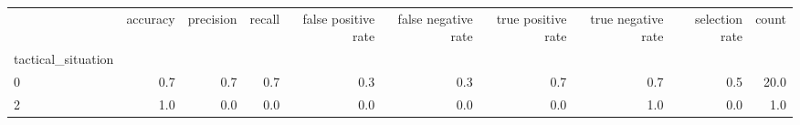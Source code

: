 \begin{tabular}{lrrrrrrrrr}
\toprule
{} &  accuracy &  precision &  recall &  false positive rate &  false negative rate &  true positive rate &  true negative rate &  selection rate &  count \\
tactical\_situation &           &            &         &                      &                      &                     &                     &                 &        \\
\midrule
0                  &       0.7 &        0.7 &     0.7 &                  0.3 &                  0.3 &                 0.7 &                 0.7 &             0.5 &   20.0 \\
2                  &       1.0 &        0.0 &     0.0 &                  0.0 &                  0.0 &                 0.0 &                 1.0 &             0.0 &    1.0 \\
\bottomrule
\end{tabular}
